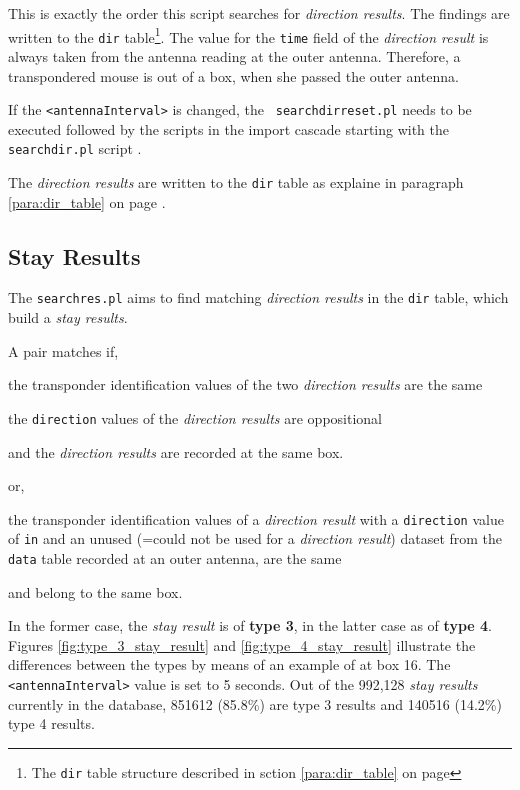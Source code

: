 This is exactly the order this script searches for \textit{direction results}. The findings are written to the \lstinline|dir| table\footnote{The \lstinline|dir| table structure described in sction \ref{para:dir_table} on page \pageref{para:dir_table}}. The value for the \lstinline|time| field of the \textit{direction result} is always taken from the antenna reading at the outer antenna. Therefore, a transpondered mouse is out of a box, when she passed the outer antenna. 

If the \lstinline|<antennaInterval>| is changed, the \lstinline| searchdirreset.pl| needs to be executed followed by the scripts in the import cascade starting with the \lstinline|searchdir.pl| script \footnotemark[14].

The \textit{direction results} are written to the \lstinline|dir| table as explaine in paragraph \ref{para:dir_table} on page \pageref{para:dir_table}. 

\subsection{Stay Results}
\label{subsec:stayres}

The \lstinline|searchres.pl| aims to find matching \textit{direction results} in the \lstinline|dir| table, which build a \textit{stay results}.

A pair matches if,

\begin{mylist}
\item the transponder identification values of the two \textit{direction results} are the same
\item the \lstinline|direction| values of the \textit{direction results} are oppositional
\item and the \textit{direction results} are recorded at the same box.
\end{mylist}

or,

\begin{mylist}
\item the transponder identification values of a \textit{direction result} with a \lstinline|direction| value of \lstinline|in| and an unused (=could not be used for a \textit{direction result}) dataset from the \lstinline|data| table recorded at an outer antenna, are the same
\item and belong to the same box.
\end{mylist}

In the former case, the \textit{stay result} is of \textbf{type 3}, in the latter case as of \textbf{type 4}. Figures \ref{fig:type_3_stay_result} and \ref{fig:type_4_stay_result} illustrate the differences between the types by means of an example of at box 16. The \lstinline|<antennaInterval>| value is set to 5 seconds. Out of the 992,128 \textit{stay results} currently in the database, 851612 (85.8\%) are type 3 results and 140516 (14.2\%) type 4 results.

